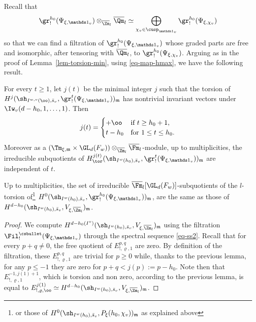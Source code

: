 Recall that
\[
\gr^{h_0}_!(\Psi_{\xi,\mathds 1_v}) \otimes_{\overline \Zm_l} \overline \Qm_l \simeq
\bigoplus_{\chi_v \in \cusp_{\mathds 1_v}} \gr^{h_0}_{!}(\Psi_{\xi,\chi_v})
\]
so that we can find a filtration of $\gr^{h_0}_!(\Psi_{\xi,\mathds 1_v})$ whose graded parts are
free and isomorphic, after tensoring with $\overline \Qm_l$, to
$\gr^{h_0}_{!}(\Psi_{\xi,\chi_v})$.
Arguing as in the proof of Lemma~\ref{lem-torsion-min}, using \eqref{eq-map-hmax},
we have the following result.

\begin{lemma} \label{lem-important2}
For every $t\geq1$, let $j(t)$ be the minimal integer $j$ such that the torsion of
$H^j(\sh_{I^{w,v}(\oo),\bar s_v},\gr^t_{!}(\Psi_{\xi,\mathds 1_v}))_{\mathfrak m}$ has
nontrivial invariant vectors under $\Iw_v(d-h_0,1,\dots,1)$. Then
\[
j(t)=\begin{cases}
+ \oo & \text{if } t \geq h_0+1, \\
t-h_0 & \text{for } 1 \leq t \leq h_0.
\end{cases}
\]
Moreover as a $(\Tm_{\xi,\mathfrak m} \times \GL_d(F_w)) \otimes_{\overline \Zm_l} \overline \Fm_l$-module,
up to multiplicities, the irreducible subquotients of
$H_{\tor}^{j(t)}(\sh_{I^{w}(h_0),\bar s_v},\gr^t_{!}
(\Psi_{\xi,\mathds 1_v}))_{\mathfrak m}$ are
independent of $t$.
\end{lemma}

\begin{prop} \label{prop-important}
Up to multiplicities, the set of irreducible
$\overline \Fm_l[\GL_d(F_w)]$-subquotients of the $l$-torsion of\footnote{or
those of $H^{0}(\sh_{I^w(h_0),\bar s_v},P_\xi(h_0,\chi_v))_{\mathfrak m}$
as explained above}
$H^{0}(\sh_{I^w(h_0),\bar s_v},\gr^{h_0}_{!}(\Psi_{\xi,\mathds 1_v}))_{\mathfrak m}$,
are the same as those of
$H^{d-h_0}(\sh_{I^w(h_0),\bar s_v},V_{\xi,\overline \Zm_l})_{\mathfrak m}$.
\end{prop}

\begin{proof}
We compute $H^{d-h_0(I^v)}(\sh_{I^w(h_0),\bar s_v},V_{\xi,\overline \Zm_l})_{\mathfrak m}$
using the filtration $\Fil^{\csbullet}_!(\Psi_{\xi,\mathds 1_v})$ through the spectral sequence
\eqref{eq-ss2}. Recall that for every $p+q \neq 0$, the free quotient of $E^{p,q}_{!,\varrho,1}$
are zero. By definition of the filtration, these $E^{p,q}_{!,\varrho,1}$ are trivial for $p \geq 0$
while, thanks to the previous lemma, for any $p \leq -1$ they are zero for
$p+q < j(p):=p-h_0$. Note then that
$E_{!,\varrho,1}^{-1,j(1)+1}$, which is torsion and non zero, according to the previous lemma,
is equal to $E_{!,\varrho,\oo}^{j(1)} \simeq
H^{d-h_0}(\sh_{I^w(h_0),\bar s_v},V_{\xi,\overline \Zm_l})_{\mathfrak m}$.
\end{proof}

